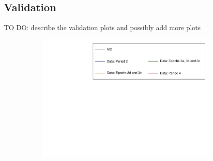 \documentclass[12pt,a4paper]{article}
\begin{document}
\subsection{Validation}
TO DO: describe the validation plots and possibly add more plots

\begin{figure}[!ht]
  \begin{subfigure}{\textwidth}
  \centering
    \includegraphics[height=0.2\linewidth]{essentialsec_tb/legend.pdf}
  \end{subfigure}
  \vspace*{2mm}
  

\end{figure}
\end{document}
